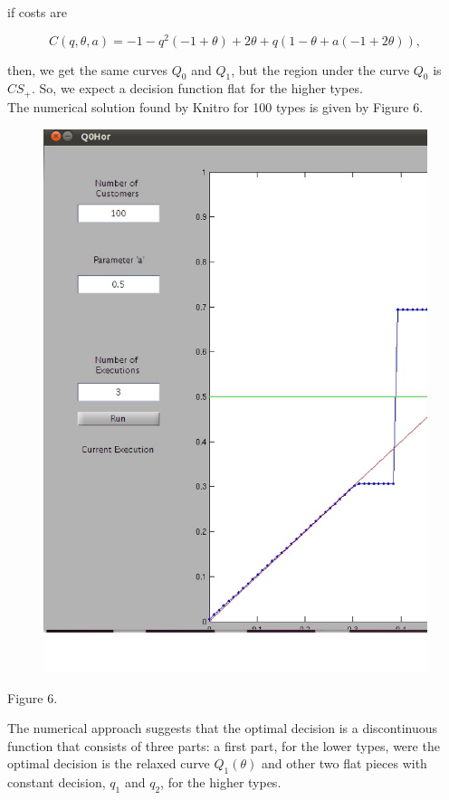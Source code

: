 \begin{itemize}
if costs are

 $$C(q,\theta,a)= -1 - q^{2} (-1 + \theta) + 2 \theta + q (1 - \theta + a (-1 + 2 \theta)),$$


then, we get the same curves $Q_{0}$ and $Q_{1}$, but the region under the curve $Q_{0}$ is $CS_{+}$. So, we expect a decision function flat for the higher types.\\

The numerical solution found by Knitro for 100 types is given by Figure 6.\\

\begin{center}
\begin{figure}[h!]
\includegraphics[scale=0.2]{100tiposq0hor.eps} 
\end{figure}
Figure 6.
\end{center}

The numerical approach suggests that the optimal decision is a discontinuous function that consists of three parts: a first part, for the lower types, were the optimal decision is the relaxed curve $Q_{1}(\theta)$ and other two flat pieces with constant decision, $q_{1}$ and $q_{2}$, for the higher types.\\


\end{itemize}

